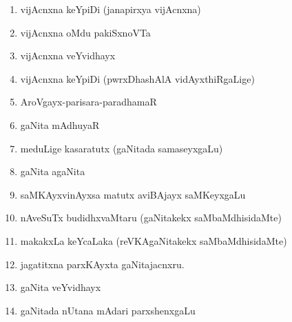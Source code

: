 \begin{enumerate}[{\rm 1)}]
\item vijAcnxna keYpiDi (janapirxya vijAcnxna)
\item vijAcnxna oMdu pakiSxnoVTa
\item vijAcnxna veYvidhayx
\item vijAcnxna keYpiDi (pwrxDhashAlA vidAyxthiRgaLige)
\item AroVgayx-parisara-paradhamaR
\item gaNita mAdhuyaR
\item meduLige kasaratutx (gaNitada samaseyxgaLu)
\item gaNita agaNita
\item saMKAyxvinAyxsa matutx aviBAjayx saMKeyxgaLu
\item nAveSuTx budidhxvaMtaru (gaNitakekx saMbaMdhisidaMte)
\item makakxLa keYcaLaka (reVKAgaNitakekx saMbaMdhisidaMte)
\item jagatitxna parxKAyxta gaNitajacnxru.
\item gaNita veYvidhayx 
\item gaNitada nUtana mAdari parxshenxgaLu
\end{enumerate}
